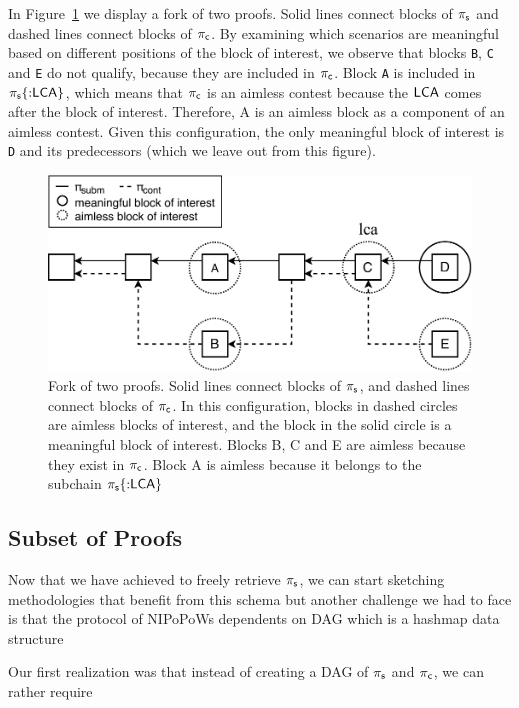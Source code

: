\renewcommand{\block}{}

In Figure~\ref{fig:boi-position} we display a fork of two proofs. Solid lines
connect blocks of $\mathsf{\pi_{s}}$ and dashed lines connect blocks of $\mathsf{\pi_{c}}$. By
examining which scenarios are meaningful based on different positions of the
block of interest, we observe that blocks \texttt{B}, \texttt{C} and \texttt{E}
do not qualify, because they are included in $\mathsf{\pi_{c}}$. Block \texttt{A} is
included in $\mathsf{\pi_{s}}\{{:}\mathsf{LCA}\}$, which means that $\mathsf{\pi_{c}}$ is an aimless contest
because the $\mathsf{LCA}$ comes after the block of interest. Therefore, A is an
aimless block as a component of an aimless contest. Given this configuration,
the only meaningful block of interest is \texttt{D} and its predecessors (which
we leave out from this figure).

\begin{figure}[H]
    \begin{center}
        \includegraphics[width=0.6\columnwidth]{figures/boi-position.pdf}
    \end{center}
    \caption{Fork of two proofs.
    Solid lines connect blocks of $\mathsf{\pi_{s}}$,
    and dashed lines connect blocks of $\mathsf{\pi_{c}}$.
    In this configuration,
    blocks in dashed circles are aimless blocks of interest, and the block
    in the solid circle is a meaningful block of interest. Blocks B, C and E are
    aimless because they exist in $\mathsf{\pi_{c}}$. Block A is aimless because it
    belongs to the subchain $\mathsf{\pi_{s}}\{{:}\mathsf{LCA}\}$
    }
    \label{fig:boi-position}
\end{figure}

\subsection{Subset of Proofs}

Now that we have achieved to freely retrieve $\mathsf{\pi_{s}}$, we can start
sketching methodologies that benefit from this schema but another challenge we
had to face is that the protocol of NIPoPoWs dependents on DAG which is a
hashmap data structure

Our first realization was that instead of creating a DAG of $\mathsf{\pi_{s}}$ and
$\mathsf{\pi_{c}}$, we can rather require

